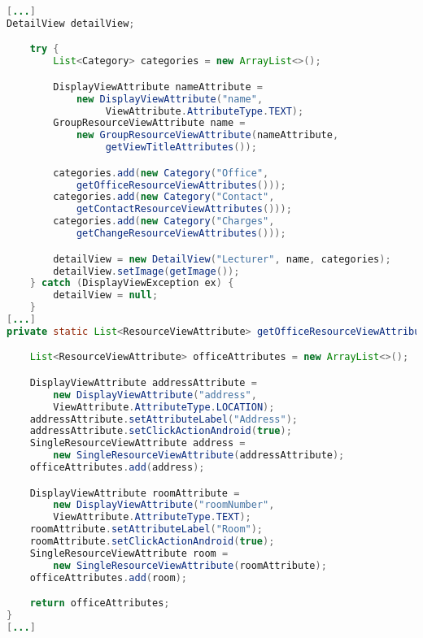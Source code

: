 \begin{lstlisting}[label=lst:detailview_impl,
language=java,
firstnumber=1,
caption=Erstellung einer \textit{DetailView}.]				   
[...]
DetailView detailView;

	try {
		List<Category> categories = new ArrayList<>();

		DisplayViewAttribute nameAttribute = 
			new DisplayViewAttribute("name",
				 ViewAttribute.AttributeType.TEXT);
		GroupResourceViewAttribute name = 
			new GroupResourceViewAttribute(nameAttribute,
				 getViewTitleAttributes());

		categories.add(new Category("Office",
			getOfficeResourceViewAttributes()));
		categories.add(new Category("Contact", 
			getContactResourceViewAttributes()));
		categories.add(new Category("Charges", 
			getChangeResourceViewAttributes()));

		detailView = new DetailView("Lecturer", name, categories);
		detailView.setImage(getImage());
	} catch (DisplayViewException ex) {
		detailView = null;
	}
[...]
private static List<ResourceViewAttribute> getOfficeResourceViewAttributes() {

	List<ResourceViewAttribute> officeAttributes = new ArrayList<>();

	DisplayViewAttribute addressAttribute = 
		new DisplayViewAttribute("address", 
		ViewAttribute.AttributeType.LOCATION);
	addressAttribute.setAttributeLabel("Address");
	addressAttribute.setClickActionAndroid(true);
	SingleResourceViewAttribute address = 
		new SingleResourceViewAttribute(addressAttribute);
	officeAttributes.add(address);

	DisplayViewAttribute roomAttribute = 
		new DisplayViewAttribute("roomNumber", 
		ViewAttribute.AttributeType.TEXT);
	roomAttribute.setAttributeLabel("Room");
	roomAttribute.setClickActionAndroid(true);
	SingleResourceViewAttribute room = 
		new SingleResourceViewAttribute(roomAttribute);
	officeAttributes.add(room);

	return officeAttributes;
}
[...]
\end{lstlisting}

\newpage

